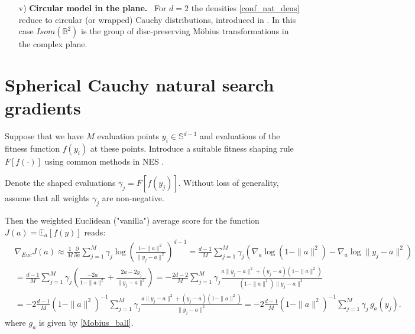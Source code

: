 \documentclass{article}
\theoremstyle{plain}%
\theoremstyle{definition}
\theoremstyle{remark}
\theoremstyle{prop}
\begin{document}
\begin{enumerate}
The expression \eqref{Fisher_conf_nat} unveils remarkable fact that the Fisher information metric turns the family $sC(a)$ into the Poincar\' e ball (up to the dimension-adjustment multiplier).

\item[v)] {\bf Circular model in the plane.} \, 
For $d=2$ the densities \eqref{conf_nat_dens} reduce to circular (or wrapped) Cauchy distributions, introduced in \cite{McCullagh}. In this case $Isom(\mathbb{B}^2)$ is the group of disc-preserving M\" obius transformations in the complex plane.

\end{enumerate}

\section{Spherical Cauchy natural search gradients}

Suppose that we have $M$ evaluation points $y_i \in {\mathbb S}^{d-1}$ and evaluations of the fitness function $f(y_i)$ at these points. Introduce a suitable fitness shaping rule $F[f(\cdot)]$ using common methods in NES \cite{Wierstra,HA}.
 
Denote the shaped evaluations $\gamma_j = F[f(y_j)]$. Without loss of generality, assume that all weights $\gamma_j$ are non-negative.

Then the weighted Euclidean ("vanilla") average score for the function $J(a) = {\mathbb E}_a [f(y)]$ reads:
\begin{equation}
\label{sC_policy_gradients}
\begin{split}
& \nabla_{Euc} J(a) \approx \frac{1}{M} \frac{\partial}{\partial a} \sum_{j=1}^M \gamma_j \log \left( \frac{1- \| a \|^2}{\| y_j-a\|^2} \right)^{d-1} = \frac{d-1}{M} \sum_{j=1}^M \gamma_j \left( \nabla_a \log (1- \| a \|^2) - \nabla_a \log \| y_j - a\|^2 \right)  \nonumber \\
& = \frac{d-1}{M} \sum_{j=1}^M \gamma_j \left( \frac{-2a}{1-\| a \|^2} + \frac{2a - 2y_j}{\| y_j-a \|^2} \right) = - \frac{2d-2}{M} \sum_{j=1}^M \gamma_j \frac{a \| y_j - a\|^2 + (y_j-a) (1 - \| a \|^2)}{(1 - \| a\|^2)\|y_j - a\|^2} \nonumber \\
& = - 2 \frac{d-1}{M} (1-\| a \|^2)^{-1} \sum_{j=1}^M \gamma_j \frac{a \| y_j - a\|^2 + (y_j-a) (1 - \| a \|^2)}{\|y_j - a\|^2} = - 2 \frac{d-1}{M} (1 - \| a\|^2)^{-1} \sum_{j=1}^M \gamma_j \, g_a(y_j).
\end{split}
\end{equation}
where $g_a$ is given by \eqref{Mobius_ball}.
\end{document}
